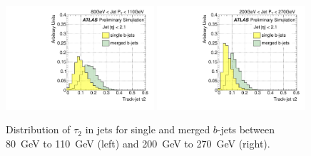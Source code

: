 \begin{figure}[tp]
\centering
\includegraphics[width=0.49\textwidth]{FIGS/VarsSingleMerged/Tau2080.pdf}
\includegraphics[width=0.49\textwidth]{FIGS/VarsSingleMerged/Tau2200.pdf}
\caption{Distribution of $\tau_2$ in jets for single and merged $b$-jets between 80~GeV to 110~GeV (left) and 200~GeV to 270~GeV (right).}
\label{fig:tau2singlemerged}
\end{figure}


